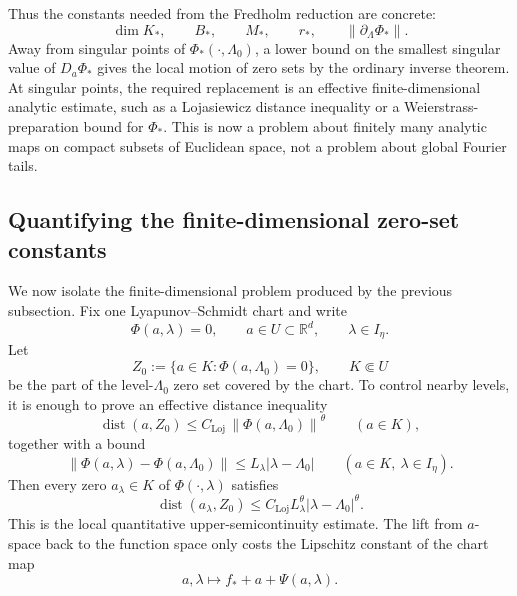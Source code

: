 \documentclass[12pt]{article}
\theoremstyle{definition}
\theoremstyle{remark}
\newcommand{\R}{\mathbb{R}}
\newcommand{\norm}[1]{\left\|#1\right\|}
\begin{document}
Thus the constants needed from the Fredholm reduction are concrete:
\[
  \dim K_*,
  \qquad
  B_*,
  \qquad
  M_*,
  \qquad
  r_*,
  \qquad
  \norm{\partial_\Lambda\Phi_*}.
\]
Away from singular points of $\Phi_*(\cdot,\Lambda_0)$, a lower bound on
the smallest singular value of $D_a\Phi_*$ gives the local motion of zero
sets by the ordinary inverse theorem.  At singular points, the required
replacement is an effective finite-dimensional analytic estimate, such as
a Lojasiewicz distance inequality or a Weierstrass-preparation bound for
\(\Phi_*\).  This is now a problem about finitely many analytic maps on
compact subsets of Euclidean space, not a problem about global Fourier
tails.

\subsection{Quantifying the finite-dimensional zero-set constants}
\label{sec:quant-lojasiewicz-chart}

We now isolate the finite-dimensional problem produced by the previous
subsection.  Fix one Lyapunov--Schmidt chart and write
\[
  \Phi(a,\lambda)=0,
  \qquad
  a\in U\subset\R^d,\qquad \lambda\in I_\eta.
\]
Let
\[
  Z_0:=\{a\in K:\Phi(a,\Lambda_0)=0\},
  \qquad K\Subset U
\]
be the part of the level-$\Lambda_0$ zero set covered by the chart.  To
control nearby levels, it is enough to prove an effective distance
inequality
\begin{equation}\label{eq:chart-loj}
  \operatorname{dist}(a,Z_0)
  \leq C_{\mathrm{Loj}}\,
  \norm{\Phi(a,\Lambda_0)}^{\theta}
  \qquad (a\in K),
\end{equation}
together with a bound
\begin{equation}\label{eq:lambda-lip-Phi}
  \norm{\Phi(a,\lambda)-\Phi(a,\Lambda_0)}
  \leq L_\lambda |\lambda-\Lambda_0|
  \qquad (a\in K,\ \lambda\in I_\eta).
\end{equation}
Then every zero \(a_\lambda\in K\) of \(\Phi(\cdot,\lambda)\) satisfies
\begin{equation}\label{eq:chart-zero-motion}
  \operatorname{dist}(a_\lambda,Z_0)
  \leq
  C_{\mathrm{Loj}}L_\lambda^\theta
  |\lambda-\Lambda_0|^\theta .
\end{equation}
This is the local quantitative upper-semicontinuity estimate.  The lift
from \(a\)-space back to the function space only costs the Lipschitz
constant of the chart map
\[
  a,\lambda\mapsto f_*+a+\Psi(a,\lambda).
\]
\end{document}
